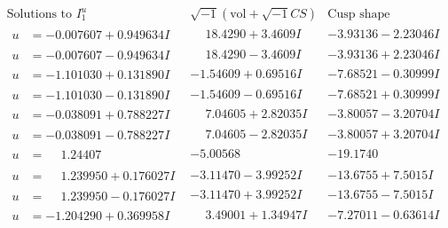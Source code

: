 \documentclass[1p]{elsarticle_modified}
\theoremstyle{definition}
\newcommand{\I}{\sqrt{-1}}
\begin{document}
$$\begin{array}{c|c|c}  
\text{Solutions to }I^u_{1}& \I (\text{vol} + \sqrt{-1}CS) & \text{Cusp shape}\\
 \hline 
\begin{aligned}
u &= -0.007607 + 0.949634 I\end{aligned}
 & \phantom{-}18.4290 + 3.4609 I & -3.93136 - 2.23046 I \\ \hline\begin{aligned}
u &= -0.007607 - 0.949634 I\end{aligned}
 & \phantom{-}18.4290 - 3.4609 I & -3.93136 + 2.23046 I \\ \hline\begin{aligned}
u &= -1.101030 + 0.131890 I\end{aligned}
 & -1.54609 + 0.69516 I & -7.68521 - 0.30999 I \\ \hline\begin{aligned}
u &= -1.101030 - 0.131890 I\end{aligned}
 & -1.54609 - 0.69516 I & -7.68521 + 0.30999 I \\ \hline\begin{aligned}
u &= -0.038091 + 0.788227 I\end{aligned}
 & \phantom{-}7.04605 + 2.82035 I & -3.80057 - 3.20704 I \\ \hline\begin{aligned}
u &= -0.038091 - 0.788227 I\end{aligned}
 & \phantom{-}7.04605 - 2.82035 I & -3.80057 + 3.20704 I \\ \hline\begin{aligned}
u &= \phantom{-}1.24407\phantom{ +0.000000I}\end{aligned}
 & -5.00568\phantom{ +0.000000I} & -19.1740\phantom{ +0.000000I} \\ \hline\begin{aligned}
u &= \phantom{-}1.239950 + 0.176027 I\end{aligned}
 & -3.11470 - 3.99252 I & -13.6755 + 7.5015 I \\ \hline\begin{aligned}
u &= \phantom{-}1.239950 - 0.176027 I\end{aligned}
 & -3.11470 + 3.99252 I & -13.6755 - 7.5015 I \\ \hline\begin{aligned}
u &= -1.204290 + 0.369958 I\end{aligned}
 & \phantom{-}3.49001 + 1.34947 I & -7.27011 - 0.63614 I \\ \hline\begin{aligned}

\end{aligned}
\end{array}$$
\end{document}
